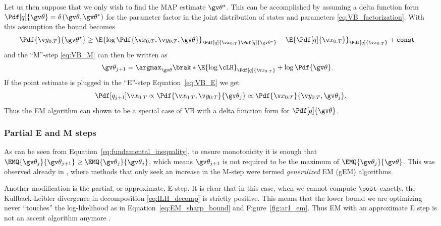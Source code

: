 Let us then suppose that we only wish to find the MAP estimate $\Th^*$. This can be accomplished
by assuming a delta function form $\Pdf[q]{\Th}=\delta\left(\Th,\Th^*\right)$ for the parameter factor in the
joint distribution of states and parameters \eqref{eq:VB_factorization}.
With this assumption the bound becomes
\begin{align}
	\Pdf{\Y}{\Th^*} &\geq \E{\log\Pdf{\X,\Y,\Th}}_{\Pdf[q]{\X}\Pdf[q]{\Th^*}} -  \E{\Pdf[q]{\X}}_{\Pdf[q]{\X}} +
	\mathtt{const}
	\label{eq:VB_MAP_boundl}
\end{align}
and the ``M''-step \eqref{eq:VB_M} can then be written as
\begin{align}
	\Th_{j+1} &= \argmax_{\Th}\brak*{\E{\log\cLH}_{\Pdf[q]{\X}}+\log\Pdf{\Th}}.	
\end{align}
If the point estimate is plugged in the ``E''-step Equation~\eqref{eq:VB_E} we get
\begin{align}
	\Pdf[q_{j+1}]{\X}\propto \Pdf{\X,\Y}{\Th_j} \propto \Pdf{\X}{\Y,\Th_j}.
\end{align}
Thus the EM algorithm can shown to be a special case of VB with a delta function form
for $\Pdf[q]{\Th}$.


\subsubsection{Partial E and M steps}%
\label{sec:EM_partial}
As can be seen from Equation~\eqref{eq:fundamental_inequality},
to ensure monotonicity it is enough that $\EMQ{\Th_j}{\Th_{j+1}}\geq \EMQ{\Th_{j}}{\Th_j}$,
which means $\Th_{j+1}$ is not required to be the maximum of $\EMQ{\Th_j}{\Th}$.
This was observed already in \textcite{Dempster1977}, where methods
that only seek an increase in the M-step were termed 
\emph{generalized} EM (gEM) algorithms. 

Another modification is the partial, or approximate, E-step. It is clear
that in this case, when we cannot compute $\post$ exactly, the Kullback-Leibler 
divergence in decomposition \eqref{eq:lLH_decomp} is strictly positive. This
means that the lower bound we are optimizing never ``touches'' the log-likelihood
as in Equation~\eqref{eq:EM_sharp_bound} and Figure~\ref{fig:ar1_em}. 
Thus EM with an approximate  E step is not an ascent 
algorithm anymore \parencite{Goodwin2005}.

